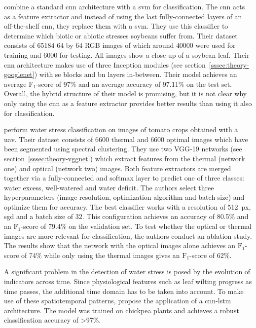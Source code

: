 \documentclass[draft,final]{vutinfth} %
\begin{document}
\textcite{venal2019} combine a standard \gls{cnn} architecture with a
\gls{svm} for classification. The \gls{cnn} acts as a feature
extractor and instead of using the last fully-connected layers of an
off-the-shelf \gls{cnn}, they replace them with a \gls{svm}. They use
this classifier to determine which biotic or abiotic stresses soybeans
suffer from. Their dataset consists of $65184$ $64$ by $64$ RGB
images of which around $40000$ were used for training and $6000$ for
testing. All images show a close-up of a soybean leaf. Their \gls{cnn}
architecture makes use of three Inception modules (see
section~\ref{sssec:theory-googlenet}) with \gls{se} blocks and
\gls{bn} layers in-between. Their model achieves an average
$\mathrm{F}_1$-score of 97\% and an average accuracy of 97.11\% on the
test set. Overall, the hybrid structure of their model is promising,
but it is not clear why only using the \gls{cnn} as a feature
extractor provides better results than using it also for
classification.

\textcite{aversano2022} perform water stress classification on images
of tomato crops obtained with a \gls{uav}. Their dataset consists of
$6600$ thermal and $6600$ optimal images which have been segmented
using spectral clustering. They use two VGG-19 networks (see
section~\ref{sssec:theory-vggnet}) which extract features from the
thermal (network one) and optical (network two) images. Both feature
extractors are merged together via a fully-connected and softmax layer
to predict one of three classes: water excess, well-watered and water
deficit. The authors select three hyperparameters (image resolution,
optimization algorithm and batch size) and optimize them for
accuracy. The best classifier works with a resolution of
\qty{512}{px}, \gls{sgd} and a batch size of $32$. This configuration
achieves an accuracy of 80.5\% and an $\mathrm{F}_1$-score of 79.4\%
on the validation set. To test whether the optical or thermal images
are more relevant for classification, the authors conduct an ablation
study. The results show that the network with the optical images alone
achieves an $\mathrm{F}_1$-score of 74\% while only using the thermal
images gives an $\mathrm{F}_1$-score of 62\%.

A significant problem in the detection of water stress is posed by the
evolution of indicators across time. Since physiological features such
as leaf wilting progress as time passes, the additional time domain
has to be taken into account. To make use of these spatiotemporal
patterns, \textcite{azimi2021} propose the application of a
\gls{cnn-lstm} architecture. The model was trained on chickpea plants
and achieves a robust classification accuracy of >97\%.
\end{document}
